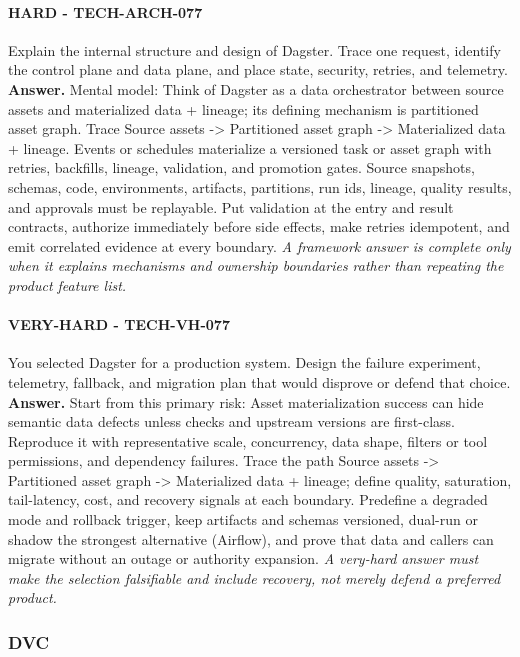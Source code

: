\paragraph{HARD - TECH-ARCH-077} Explain the internal structure and design of Dagster. Trace one request, identify the control plane and data plane, and place state, security, retries, and telemetry.
\textbf{Answer.} Mental model: Think of Dagster as a data orchestrator between source assets and materialized data + lineage; its defining mechanism is partitioned asset graph. Trace Source assets -> Partitioned asset graph -> Materialized data + lineage. Events or schedules materialize a versioned task or asset graph with retries, backfills, lineage, validation, and promotion gates. Source snapshots, schemas, code, environments, artifacts, partitions, run ids, lineage, quality results, and approvals must be replayable. Put validation at the entry and result contracts, authorize immediately before side effects, make retries idempotent, and emit correlated evidence at every boundary.
\textit{A framework answer is complete only when it explains mechanisms and ownership boundaries rather than repeating the product feature list.}
\paragraph{VERY-HARD - TECH-VH-077} You selected Dagster for a production system. Design the failure experiment, telemetry, fallback, and migration plan that would disprove or defend that choice.
\textbf{Answer.} Start from this primary risk: Asset materialization success can hide semantic data defects unless checks and upstream versions are first-class. Reproduce it with representative scale, concurrency, data shape, filters or tool permissions, and dependency failures. Trace the path Source assets -> Partitioned asset graph -> Materialized data + lineage; define quality, saturation, tail-latency, cost, and recovery signals at each boundary. Predefine a degraded mode and rollback trigger, keep artifacts and schemas versioned, dual-run or shadow the strongest alternative (Airflow), and prove that data and callers can migrate without an outage or authority expansion.
\textit{A very-hard answer must make the selection falsifiable and include recovery, not merely defend a preferred product.}
\subsubsection*{DVC}
